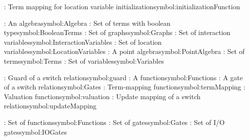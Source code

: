 \begin{tabbing}
\addsymbol \initializationFunction: {Term mapping for location variable initialization}{symbol:initializationFunction}

\addsymbol \Algebra: {An algebra}{symbol:Algebra}
\addsymbol \BooleanTerms: {Set of terms with boolean type}{symbol:BooleanTerms}
\addsymbol \Graphs: {Set of graphs}{symbol:Graphs}
\addsymbol \InteractionVariables: {Set of interaction variables}{symbol:InteractionVariables}
\addsymbol \LocationVariables: {Set of location variables}{symbol:LocationVariables}
\addsymbol \PointAlgebra: {A point algebra}{symbol:PointAlgebra}
\addsymbol \Terms: {Set of terms}{symbol:Terms}
\addsymbol \Variables: {Set of variables}{symbol:Variables}

\addsymbol \guard: {Guard of a switch relation}{symbol:guard}
\addsymbol \function: {A function}{symbol:Functions}
\addsymbol \gate: {A gate of a switch relation}{symbol:Gates}
\addsymbol \termMapping: {Term-mapping function}{symbol:termMapping}
\addsymbol \valuation: {Valuation function}{symbol:valuation}
\addsymbol \updateMapping: {Update mapping of a switch relation}{symbol:updateMapping}

\addsymbol \Functions: {Set of functions}{symbol:Functions}
\addsymbol \Gates: {Set of gates}{symbol:Gates}
\addsymbol \IOGates: {Set of I/O gates}{symbol:IOGates}

\end{tabbing}
